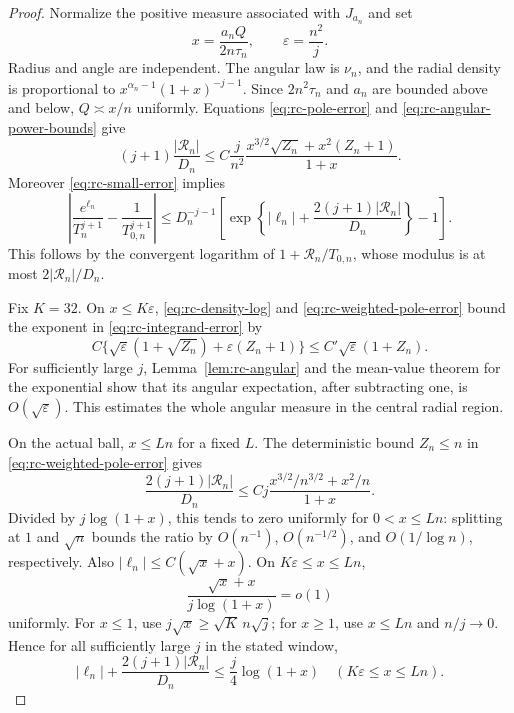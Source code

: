 \documentclass[11pt]{article}
\numberwithin{equation}{section}
\theoremstyle{definition}
\begin{document}
\begin{proof}
Normalize the positive measure associated with $J_{a_n}$ and set
\[
 x=\frac{a_nQ}{2n\tau_n},\qquad \varepsilon=\frac{n^2}{j}.
\]
Radius and angle are independent.  The angular law is $\nu_n$,
and the radial density is proportional to
$x^{\alpha_n-1}(1+x)^{-j-1}$.  Since $2n^2\tau_n$ and $a_n$
are bounded above and below, $Q\asymp x/n$ uniformly.  Equations
\eqref{eq:rc-pole-error} and \eqref{eq:rc-angular-power-bounds}
give
\begin{equation}\label{eq:rc-weighted-pole-error}
 (j+1)\frac{|\mathcal R_n|}{D_n}
 \le C\frac j{n^2}
   \frac{x^{3/2}\sqrt{Z_n}+x^2(Z_n+1)}{1+x}.
\end{equation}
Moreover \eqref{eq:rc-small-error} implies
\begin{equation}\label{eq:rc-integrand-error}
 \left|\frac{e^{\ell_n}}{T_n^{j+1}}
                 -\frac1{T_{0,n}^{j+1}}\right|
 \le D_n^{-j-1}
 \left[\exp\left\{|\ell_n|+
               \frac{2(j+1)|\mathcal R_n|}{D_n}\right\}-1\right].
\end{equation}
This follows by the convergent logarithm of
$1+\mathcal R_n/T_{0,n}$, whose modulus is at most
$2|\mathcal R_n|/D_n$.

Fix $K=32$.  On $x\le K\varepsilon$,
\eqref{eq:rc-density-log} and \eqref{eq:rc-weighted-pole-error}
bound the exponent in \eqref{eq:rc-integrand-error} by
\[
 C\{\sqrt\varepsilon(1+\sqrt{Z_n})+
                       \varepsilon(Z_n+1)\}
 \le C'\sqrt\varepsilon(1+Z_n).
\]
For sufficiently large $j$, Lemma~\ref{lem:rc-angular} and the
mean-value theorem for the exponential show that its angular
expectation, after subtracting one, is $O(\sqrt\varepsilon)$.
This estimates the whole angular measure in the central radial
region.

On the actual ball, $x\le Ln$ for a fixed $L$.  The deterministic
bound $Z_n\le n$ in \eqref{eq:rc-weighted-pole-error} gives
\[
 \frac{2(j+1)|\mathcal R_n|}{D_n}
 \le Cj\frac{x^{3/2}/n^{3/2}+x^2/n}{1+x}.
\]
Divided by $j\log(1+x)$, this tends to zero uniformly for
$0<x\le Ln$: splitting at $1$ and $\sqrt n$ bounds the ratio
by $O(n^{-1})$, $O(n^{-1/2})$, and $O(1/\log n)$,
respectively.  Also $|\ell_n|\le C(\sqrt x+x)$.
On $K\varepsilon\le x\le Ln$,
\[
 \frac{\sqrt x+x}{j\log(1+x)}=o(1)
\]
uniformly.  For $x\le1$, use
$j\sqrt x\ge\sqrt K\,n\sqrt j$; for $x\ge1$, use
$x\le Ln$ and $n/j\to0$.  Hence for all sufficiently large
$j$ in the stated window,
\begin{equation}\label{eq:rc-tail-absorption}
 |\ell_n|+\frac{2(j+1)|\mathcal R_n|}{D_n}
 \le\frac j4\log(1+x)
 \quad(K\varepsilon\le x\le Ln).
\end{equation}


\end{proof}
\end{document}
